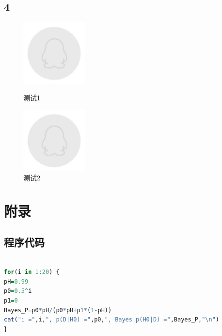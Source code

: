 \documentclass[UTF8]{ctexart}
\begin{document}
\subsection{4}



\begin{figure}[htbp]
	\centering
	\begin{minipage}[c]{0.5\textwidth}
		\centering
		\includegraphics[width=0.3\textwidth]{test.jpg}
		\caption{测试1}
	\end{minipage}%
	\begin{minipage}[c]{0.5\textwidth}
		\centering
		\includegraphics[width=0.3\textwidth]{test.jpg}
		\caption{测试2}
	\end{minipage}
\end{figure}



\section{附录}


\newpage

\begin{appendices}
\section{程序代码}
\begin{lstlisting}[language=R,escapeinside=``]

for(i in 1:20) {
pH=0.99  
p0=0.5^i 
p1=0  
Bayes_P=p0*pH/(p0*pH+p1*(1-pH))
cat("i =",i,", p(D|H0) =",p0,", Bayes p(H0|D) =",Bayes_P,"\n")
}

\end{lstlisting}
\end{appendices}
	
\end{document}
